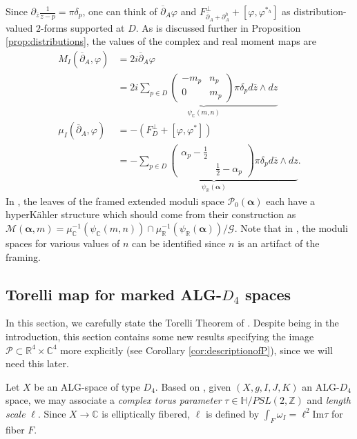 \documentclass[12pt,letterpaper,reqno]{amsart}
\def\mathbf#1{#1}%
\theoremstyle{remark}
\theoremstyle{definition}
\numberwithin{thm}{section}
\numberwithin{equation}{section}
\numberwithin{figure}{section}
\newcommand{\R}{\ensuremath{\mathbb R}}
\newcommand{\C}{\ensuremath{\mathbb C}}
\newcommand{\Z}{\ensuremath{\mathbb Z}}
\newcommand{\delbar}{\ensuremath{\overline{\partial}}}
\newcommand{\zbar}{{\ensuremath{\overline{z}}}}
\newcommand{\del}{{\partial}}
\begin{document}
Since $\del_{\zbar} \frac{1}{z-p} = \pi \delta_p$, one can think of $\delbar_A \varphi$ and $F_{\delbar_A+ \del_A^h}^\perp + [\varphi, \varphi^{*_h}]$ as distribution-valued $2$-forms supported at $D$.
As is discussed further in Proposition \ref{prop:distributions}, the values of the complex and real moment maps are 
\begin{align*}
M_{I}(\delbar_A, \varphi) &= 2 i \delbar_A \varphi \\
&=  \underbrace{2 i  \sum_{p \in D} \begin{pmatrix} -m_p& n_p\\ 0 & m_p \end{pmatrix} \pi \delta_p d \zbar \wedge d z}_{\psi_{\C}(\mathbf{m}, \mathbf{n})}\\
\mu_I(\delbar_A, \varphi) &=-(F^\perp_D  +[\varphi, \varphi^{*}])\\ \nonumber
&= \underbrace{- \sum_{p \in D} \begin{pmatrix} \alpha_p - \frac{1}{2} & \\ & \frac{1}{2}- \alpha_p \end{pmatrix} \pi \delta_p d \zbar \wedge d z}_{\psi_{\R}(\boldsymbol{\alpha})}.
\end{align*}
In \cite{collier2024conformallimitsparabolicslnchiggs}, the leaves of the framed extended moduli space $\mathcal{P}_0(\boldsymbol{\alpha})$ each have a hyperK\"ahler structure which should come from their construction as $\mathcal{M}(\boldsymbol{\alpha}, \mathbf{m})= \mu_\C^{-1}(\psi_\C(\mathbf{m}, \mathbf{n})) \cap \mu_\R^{-1}(\psi_\R(\boldsymbol{\alpha}))/\mathcal{G}$. Note that in \cite{collier2024conformallimitsparabolicslnchiggs}, the moduli spaces for various values of $\mathbf{n}$ can be identified since $\mathbf{n}$ is an artifact of the framing.


\subsection{Torelli map for marked ALG-\texorpdfstring{$D_4$}{D4} spaces}\label{subsec:Torelli_map}

In this section, we carefully state the Torelli Theorem of \cite{CVZ2024}. Despite being in the introduction, this section contains some new results specifying the image $\mathcal{P} \subset \R^4 \times \C^4$ more explicitly (see Corollary \ref{cor:descriptionofP}), since we will need this later. 

Let $X$ be an ALG-space of type $D_4$.
Based on \cite{ChenChenI, ChenChenIII},
given $(X, g, I, J , K)$ an ALG-$D_4$ space, we may associate a \emph{complex torus parameter} $\tau \in \mathbb{H}/PSL(2,\Z)$ and \emph{length scale} $\ell$. Since $X \to \C$ is elliptically fibered, $\ell$ is defined by $\int_F \omega_I = \ell^2 \mathrm{Im} \tau$ for fiber $F$. 
\end{document}
